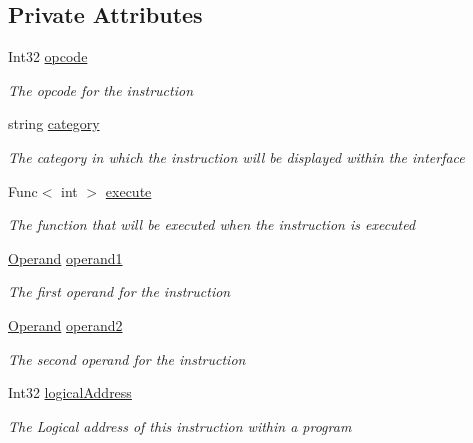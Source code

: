 \subsection*{Private Attributes}
\begin{DoxyCompactItemize}
\item 
Int32 \hyperlink{class_c_p_u___o_s___simulator_1_1_c_p_u_1_1_instruction_a746bbd915670c4c18c495804ee484e57}{opcode}
\begin{DoxyCompactList}\small\item\em The opcode for the instruction \end{DoxyCompactList}\item 
string \hyperlink{class_c_p_u___o_s___simulator_1_1_c_p_u_1_1_instruction_ac572af7b3bda0a6b0918069c1f3b14b4}{category}
\begin{DoxyCompactList}\small\item\em The category in which the instruction will be displayed within the interface \end{DoxyCompactList}\item 
Func$<$ int $>$ \hyperlink{class_c_p_u___o_s___simulator_1_1_c_p_u_1_1_instruction_ae6c5e3409f33f49c745ab57ca9a885a9}{execute}
\begin{DoxyCompactList}\small\item\em The function that will be executed when the instruction is executed \end{DoxyCompactList}\item 
\hyperlink{class_c_p_u___o_s___simulator_1_1_c_p_u_1_1_operand}{Operand} \hyperlink{class_c_p_u___o_s___simulator_1_1_c_p_u_1_1_instruction_ab829270aeebc597814ded59f5265b452}{operand1}
\begin{DoxyCompactList}\small\item\em The first operand for the instruction \end{DoxyCompactList}\item 
\hyperlink{class_c_p_u___o_s___simulator_1_1_c_p_u_1_1_operand}{Operand} \hyperlink{class_c_p_u___o_s___simulator_1_1_c_p_u_1_1_instruction_a76e9ca211aca72f65c8ad9e11fbdad47}{operand2}
\begin{DoxyCompactList}\small\item\em The second operand for the instruction \end{DoxyCompactList}\item 
Int32 \hyperlink{class_c_p_u___o_s___simulator_1_1_c_p_u_1_1_instruction_a1fec91cc29b29f1d8dd45d7d42b0560d}{logical\+Address}
\begin{DoxyCompactList}\small\item\em The Logical address of this instruction within a program \end{DoxyCompactList}\item 

\end{DoxyCompactItemize}
